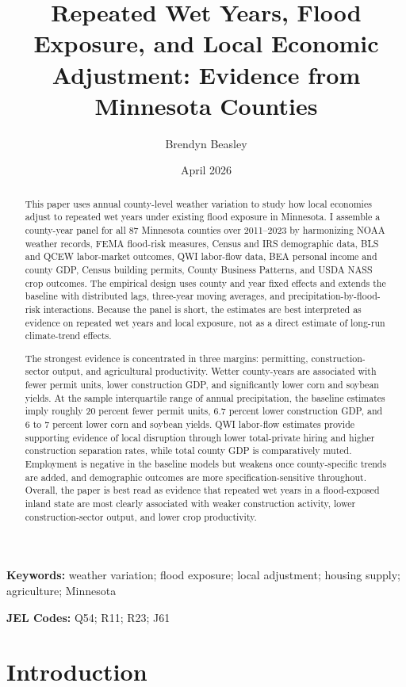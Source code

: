 \documentclass[12pt]{article}
\title{\textbf{Repeated Wet Years, Flood Exposure, and Local Economic Adjustment: Evidence from Minnesota Counties}}
\author{Brendyn Beasley}
\date{April 2026}
\begin{document}
\maketitle

\begin{abstract}
This paper uses annual county-level weather variation to study how local economies adjust to repeated wet years under existing flood exposure in Minnesota. I assemble a county-year panel for all 87 Minnesota counties over 2011--2023 by harmonizing NOAA weather records, FEMA flood-risk measures, Census and IRS demographic data, BLS and QCEW labor-market outcomes, QWI labor-flow data, BEA personal income and county GDP, Census building permits, County Business Patterns, and USDA NASS crop outcomes. The empirical design uses county and year fixed effects and extends the baseline with distributed lags, three-year moving averages, and precipitation-by-flood-risk interactions. Because the panel is short, the estimates are best interpreted as evidence on repeated wet years and local exposure, not as a direct estimate of long-run climate-trend effects.

The strongest evidence is concentrated in three margins: permitting, construction-sector output, and agricultural productivity. Wetter county-years are associated with fewer permit units, lower construction GDP, and significantly lower corn and soybean yields. At the sample interquartile range of annual precipitation, the baseline estimates imply roughly 20 percent fewer permit units, 6.7 percent lower construction GDP, and 6 to 7 percent lower corn and soybean yields. QWI labor-flow estimates provide supporting evidence of local disruption through lower total-private hiring and higher construction separation rates, while total county GDP is comparatively muted. Employment is negative in the baseline models but weakens once county-specific trends are added, and demographic outcomes are more specification-sensitive throughout. Overall, the paper is best read as evidence that repeated wet years in a flood-exposed inland state are most clearly associated with weaker construction activity, lower construction-sector output, and lower crop productivity.
\end{abstract}

\textbf{Keywords:} weather variation; flood exposure; local adjustment; housing supply; agriculture; Minnesota

\textbf{JEL Codes:} Q54; R11; R23; J61

\section{Introduction}
\end{document}
